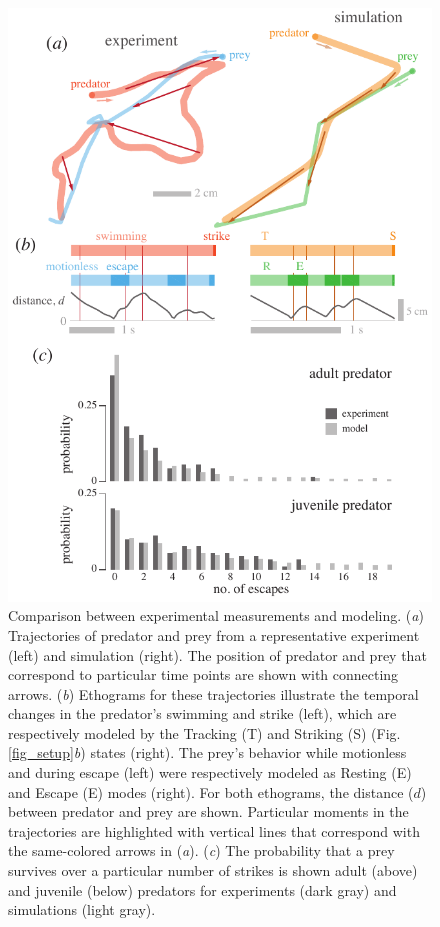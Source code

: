\documentclass[]{rsos}%
\begin{document}
\begin{figure}[!h]
\centering
	\includegraphics[width=4.5in]{fig_trajectories}
\caption{
Comparison between experimental measurements and modeling. 
(\textit{a}) Trajectories of predator and prey from a representative experiment (left) and simulation (right). 
The position of predator and prey that correspond to particular time points are shown with connecting arrows.
(\textit{b}) Ethograms for these trajectories illustrate the temporal changes in the predator's swimming and strike (left), which are respectively modeled by the Tracking (T) and Striking (S) (Fig. \ref{fig_setup}\textit{b}) states (right). 
The prey's behavior while motionless and during escape (left) were respectively modeled as Resting (E) and Escape (E) modes (right).
For both ethograms, the distance ($d$) between predator and prey are shown.
Particular moments in the trajectories are highlighted with vertical lines that correspond with the same-colored arrows in (\textit{a}).
(\textit{c}) The probability that a prey survives over a particular number of strikes is shown adult  (above) and juvenile (below) predators for experiments (dark gray) and simulations (light gray).   
}
\label{fig_traj}
\end{figure}
\end{document}
